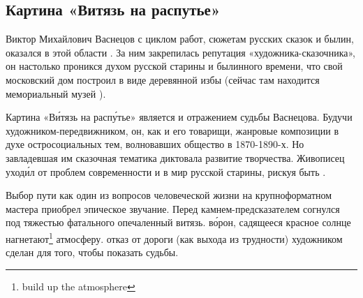 \subsection{Картина «Витязь на распутье»}

Виктор Михайлович Васнецов с циклом работ,  сюжетам русских сказок и былин, оказался  в этой области . За ним закрепилась репутация «художника-сказочника», он настолько проникся духом русской старины и былинного времени, что свой московский дом построил в виде деревянной избы (сейчас там находится мемориальный музей ).

Картина «В\'{и}тязь на расп\'{у}тье»  является и отражением судьбы Васнецова.
Будучи  художником-передвижником, он, как и его товарищи,  жанровые композиции в духе остросоциальных тем, волновавших общество в 1870-1890-х.
Но завладевшая им сказочная тематика диктовала  развитие творчества. Живописец уход\'{и}л от проблем современности и  в мир русской старины, рискуя быть .

Выбор пути как один из  вопросов человеческой жизни на крупноформатном  мастера приобрел эпическое звучание.
Перед камнем-предсказателем согнулся под тяжестью фатального  опечаленный витязь.  в\'{о}рон, садящееся красное солнце нагнетают\footnote{build up the atmosphere} атмосферу.  отказ от  дороги (как выхода из трудности) художником сделан для того, чтобы показать  судьбы.